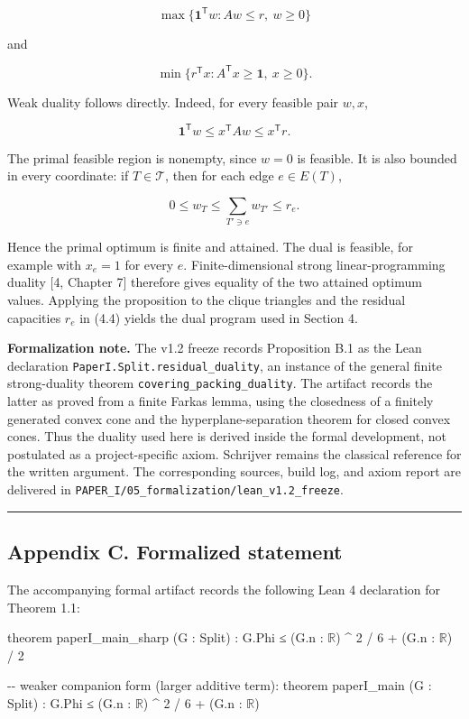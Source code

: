 \documentclass[
  american,
  11pt,
  a4paper,
]{article}
\newenvironment{Shaded}{}{}
\newcommand{\NormalTok}[1]{#1}
\newcounter{none} %
\begin{document}
\[
\max\{\mathbf 1^{\mathsf T}w:Aw\le r,\ w\ge0\}
\]

and

\[
\min\{r^{\mathsf T}x:A^{\mathsf T}x\ge\mathbf 1,\ x\ge0\}.
\]

Weak duality follows directly. Indeed, for every feasible pair \(w,x\),

\[
\mathbf 1^{\mathsf T}w
\le
x^{\mathsf T}Aw
\le
x^{\mathsf T}r.
\]

The primal feasible region is nonempty, since \(w=0\) is feasible. It is also bounded in every coordinate: if \(T\in\mathcal T\), then for each edge \(e\in E(T)\),

\[
0\le w_T\le\sum_{T'\ni e}w_{T'}\le r_e.
\]

Hence the primal optimum is finite and attained. The dual is feasible, for example with \(x_e=1\) for every \(e\). Finite-dimensional strong linear-programming duality {[}4, Chapter 7{]} therefore gives equality of the two attained optimum values. Applying the proposition to the clique triangles and the residual capacities \(r_e\) in (4.4) yields the dual program used in Section 4.

\textbf{Formalization note.} The v1.2 freeze records Proposition B.1 as the Lean declaration \texttt{PaperI.Split.residual\_duality}, an instance of the general finite strong-duality theorem \texttt{covering\_packing\_duality}. The artifact records the latter as proved from a finite Farkas lemma, using the closedness of a finitely generated convex cone and the hyperplane-separation theorem for closed convex cones. Thus the duality used here is derived inside the formal development, not postulated as a project-specific axiom. Schrijver remains the classical reference for the written argument. The corresponding sources, build log, and axiom report are delivered in \texttt{PAPER\_I/05\_formalization/lean\_v1.2\_freeze}.

\begin{center}\rule{0.5\linewidth}{0.5pt}\end{center}

\subsection{Appendix C. Formalized statement}\label{appendix-c.-formalized-statement}

The accompanying formal artifact records the following Lean 4 declaration for Theorem 1.1:

\begin{Shaded}
\begin{Highlighting}[]
\NormalTok{theorem paperI\_main\_sharp (G : Split) :}
\NormalTok{    G.Phi ≤ (G.n : \ensuremath{\mathbb{R}}) \^{} 2 / 6 + (G.n : \ensuremath{\mathbb{R}}) / 2}

\NormalTok{{-}{-} weaker companion form (larger additive term):}
\NormalTok{theorem paperI\_main (G : Split) :}
\NormalTok{    G.Phi ≤ (G.n : \ensuremath{\mathbb{R}}) \^{} 2 / 6 + (G.n : \ensuremath{\mathbb{R}})}
\end{Highlighting}
\end{Shaded}
\end{document}
